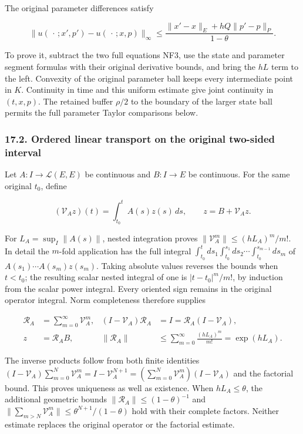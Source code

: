\documentclass[
  11pt,
]{article}
\begin{document}
The original parameter differences satisfy

\[
 \|u(\,\cdot\,;x',p')-u(\,\cdot\,;x,p)\|_\infty
 \leq\frac{\|x'-x\|_E+hQ\|p'-p\|_P}{1-\theta}.
 \tag{NF5}
\]

To prove it, subtract the two full equations NF3, use the state and
parameter segment formulas with their original derivative bounds, and
bring the \(hL\) term to the left. Convexity of the original parameter
ball keeps every intermediate point in \(K\). Continuity in time and
this uniform estimate give joint continuity in \((t,x,p)\). The retained
buffer \(\rho/2\) to the boundary of the larger state ball permits the
full parameter Taylor comparisons below.

\subsubsection{17.2. Ordered linear transport on the original two-sided
interval}\label{ordered-linear-transport-on-the-original-two-sided-interval}

Let \(A:I\to\mathcal L(E,E)\) be continuous and \(B:I\to E\) be
continuous. For the same original \(t_0\), define

\[
 (\mathcal V_Az)(t)=\int_{t_0}^t A(s)z(s)\,ds,\qquad
 z=B+\mathcal V_Az.
 \tag{NF6}
\]

For \(L_A=\sup_I\|A(s)\|\), nested integration proves
\(\|\mathcal V_A^m\|\leq(hL_A)^m/m!\). In detail the \(m\)-fold
application has the full integral
\(\int_{t_0}^t ds_1\int_{t_0}^{s_1}ds_2\cdots\int_{t_0}^{s_{m-1}}ds_m\)
of \(A(s_1)\cdots A(s_m)z(s_m)\). Taking absolute values reverses the
bounds when \(t<t_0\); the resulting scalar nested integral of one is
\(|t-t_0|^m/m!\), by induction from the scalar power integral. Every
oriented sign remains in the original operator integral. Norm
completeness therefore supplies

\[
 \begin{aligned}
 \mathcal R_A&=\sum_{m=0}^{\infty}\mathcal V_A^m,&
 (I-\mathcal V_A)\mathcal R_A
   &=I=\mathcal R_A(I-\mathcal V_A),\\
 z&=\mathcal R_AB,&
 \|\mathcal R_A\|&\leq
        \sum_{m=0}^{\infty}\frac{(hL_A)^m}{m!}
        =\exp(hL_A).
 \end{aligned}
 \tag{NF7}
\]

The inverse products follow from both finite identities
\((I-\mathcal V_A)\sum_{m=0}^N\mathcal V_A^m
=I-\mathcal V_A^{N+1}
=(\sum_{m=0}^N\mathcal V_A^m)(I-\mathcal V_A)\) and the factorial bound.
This proves uniqueness as well as existence. When \(hL_A\leq\theta\),
the additional geometric bounds \(\|\mathcal R_A\|\leq(1-\theta)^{-1}\)
and \(\|\sum_{m>N}\mathcal V_A^m\|\leq\theta^{N+1}/(1-\theta)\) hold
with their complete factors. Neither estimate replaces the original
operator or the factorial estimate.
\end{document}

